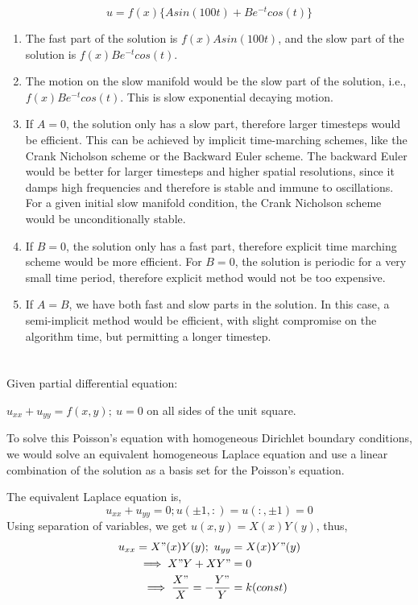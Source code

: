 \documentclass{article}
\begin{document}
$$
u = f(x)\{Asin(100t) + Be^{-t}cos(t)\}
$$

\begin{enumerate}
    \item The fast part of the solution is $f(x)Asin(100t)$, and the slow part of the solution is $f(x)Be^{-t}cos(t)$.
    
    \item The motion on the slow manifold would be the slow part of the solution, i.e., $f(x)Be^{-t}cos(t)$. This is slow exponential decaying motion.
    
    \item If $A = 0$, the solution only has a slow part, therefore larger timesteps would be efficient. This can be achieved by implicit time-marching schemes, like the Crank Nicholson scheme or the Backward Euler scheme. The backward Euler would be better for larger timesteps and higher spatial resolutions, since it damps high frequencies and therefore is stable and immune to oscillations. For a given initial slow manifold condition, the Crank Nicholson scheme would be unconditionally stable.
    
    \item If $B = 0$, the solution only has a fast part, therefore explicit time marching scheme would be more efficient. For $B = 0$, the solution is periodic for a very small time period, therefore explicit method would not be too expensive.
    
    \item If $A = B$, we have both fast and slow parts in the solution. In this case, a semi-implicit method would be efficient, with slight compromise on the algorithm time, but permitting a longer timestep. 
\end{enumerate}


\section{}

Given partial differential equation:

$ u_{xx} + u_{yy} = f(x,y); \ u = 0$ on all sides of the unit square. 

To solve this Poisson's equation with homogeneous Dirichlet boundary conditions, we would solve an equivalent homogeneous Laplace equation and use a linear combination of the solution as a basis set for the Poisson's equation.

The equivalent Laplace equation is,
$$
u_{xx} + u_{yy} = 0; u(\pm1, :) = u(:, \pm1) = 0
$$
Using separation of variables, we get $u(x,y) = X(x)Y(y)$, thus,
\begin{align}
    u_{xx} = X"(x)Y(y);\ u_{yy} &= X(x)Y"(y) \\
    \implies X"Y + XY" &= 0 \\
    \implies \frac{X"}{X} = -\frac{Y"}{Y} &= k (const) \\ 
\end{align}
\end{document}
